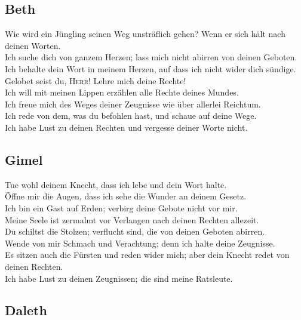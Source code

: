 \hypertarget{beth}{%
\subsection{Beth}\label{beth}}

 Wie wird ein Jüngling seinen Weg unsträflich gehen? Wenn
er sich hält nach deinen Worten.\\
 Ich suche dich von ganzem Herzen; lass mich nicht
abirren von deinen Geboten.\\
 Ich behalte dein Wort in meinem Herzen, auf dass ich
nicht wider dich sündige.\\
 Gelobet seist du, \textsc{Herr}! Lehre mich deine
Rechte!\\
 Ich will mit meinen Lippen erzählen alle Rechte deines
Mundes.\\
 Ich freue mich des Weges deiner Zeugnisse wie über
allerlei Reichtum.\\
 Ich rede von dem, was du befohlen hast, und schaue auf
deine Wege.\\
 Ich habe Lust zu deinen Rechten und vergesse deiner
Worte nicht.

\hypertarget{gimel}{%
\subsection{Gimel}\label{gimel}}

 Tue wohl deinem Knecht, dass ich lebe und dein Wort
halte.\\
 Öffne mir die Augen, dass ich sehe die Wunder an deinem
Gesetz.\\
 Ich bin ein Gast auf Erden; verbirg deine Gebote nicht
vor mir.\\
 Meine Seele ist zermalmt vor Verlangen nach deinen
Rechten allezeit.\\
 Du schiltst die Stolzen; verflucht sind, die von deinen
Geboten abirren.\\
 Wende von mir Schmach und Verachtung; denn ich halte
deine Zeugnisse.\\
 Es sitzen auch die Fürsten und reden wider mich; aber
dein Knecht redet von deinen Rechten.\\
 Ich habe Lust zu deinen Zeugnissen; die sind meine
Ratsleute.

\hypertarget{daleth}{%
\subsection{Daleth}\label{daleth}}

